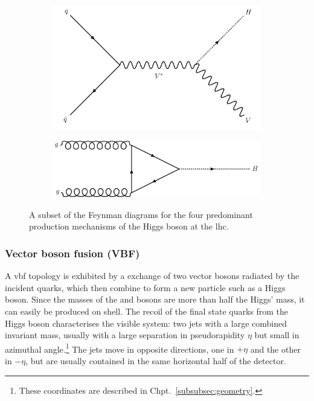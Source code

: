 \begin{figure}[htbp]
    \begin{subfigure}[b]{0.45\textwidth}
        \includegraphics[width=\textwidth]{figures/feynman_diagrams/VH.pdf}
        \caption{\VH}
    \end{subfigure}
    \hfill
    \begin{subfigure}[b]{0.45\textwidth}
        \includegraphics[width=\textwidth]{figures/feynman_diagrams/ggF.pdf}
        \caption{\ggH}
    \end{subfigure}
\caption[A subset of the Feynman diagrams for the four predominant production mechanisms of the Higgs boson at the LHC]{A subset of the Feynman diagrams for the four predominant production mechanisms of the Higgs boson at the \acrshort{lhc}.}
\label{fig:higgs_feynman_diagrams}
\end{figure}




\subsubsection{Vector boson fusion (VBF)}
\label{subsubsec:theory_hinv_VBF_mode}

A \acrshort{vbf} topology is exhibited by a \tchannel exchange of two vector bosons radiated by the incident quarks, which then combine to form a new particle such as a Higgs boson. Since the masses of the \PW and \PZ bosons are more than half the Higgs' mass, it can easily be produced on shell. The recoil of the final state quarks from the Higgs boson characterises the visible system: two \glspl{jet} with a large combined invariant mass, usually with a large separation in pseudorapidity $\eta$ but small in azimuthal angle.\footnote{These coordinates are described in Chpt.~\ref{subsubsec:geometry}.} The \glspl{jet} move in opposite directions, one in $+\eta$ and the other in $-\eta$, but are usually contained in the same horizontal half of the detector.


